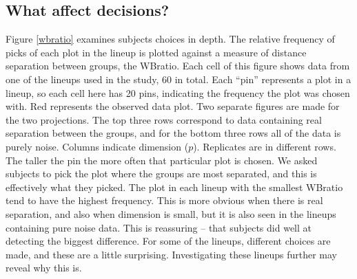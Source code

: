 
\subsection{What affect decisions?}

\normalsize

Figure \ref{wbratio} examines subjects choices in depth. The relative frequency of picks of each plot in the lineup is plotted against a measure of distance separation between groups, the WBratio. %
 Each cell of this figure shows data from one of the lineups used in the study, 60 in total. Each ``pin'' represents a plot in a lineup, so each cell here has 20 pins, indicating the frequency the plot was chosen with. Red represents the observed data plot. Two separate figures are made for the two projections. The top three rows correspond to data containing real separation between the groups, and for the bottom three rows all of the data is purely noise. Columns indicate dimension ($p$). Replicates are in different rows. The taller the pin the more often that particular plot is chosen. We asked subjects to pick the plot where the groups are most separated, and this is effectively what they picked. The plot in each lineup with the smallest WBratio tend to have the highest frequency. This is more obvious when there is real separation, and also when dimension is small, but it is also seen in the lineups containing pure noise data. This is reassuring -- that subjects did well at detecting the biggest difference.  For some of the lineups, different choices are made, and these are a little surprising. Investigating these lineups further may reveal why this is. 


